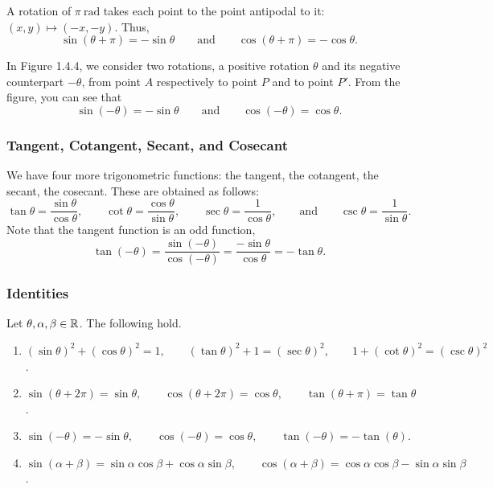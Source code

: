 \documentclass[11pt]{book}
\begin{document}
\vspace*{1.5em}

A rotation of $\pi\ \text{rad}$ takes each point to the point antipodal to it: $(x, y)\mapsto(-x, -y)$. Thus, $$\sin(\theta+\pi)=-\sin\theta\qquad\text{and}\qquad\cos(\theta+\pi)=-\cos\theta.$$

In Figure 1.4.4, we consider two rotations, a positive rotation $\theta$ and its negative counterpart $-\theta$, from point $A$ respectively to point $P$ and to point $P'$. From the figure, you can see that $$\sin(-\theta)=-\sin\theta\qquad\text{and}\qquad\cos(-\theta)=\cos\theta.$$

\subsubsection*{Tangent, Cotangent, Secant, and Cosecant}

We have four more trigonometric functions: the tangent, the cotangent, the secant, the cosecant. These are obtained as follows: $$\tan\theta=\dfrac{\sin\theta}{\cos\theta},\qquad\cot\theta=\dfrac{\cos\theta}{\sin\theta},\qquad\sec\theta=\dfrac{1}{\cos\theta},\qquad\text{and}\qquad\csc\theta=\dfrac{1}{\sin\theta}.$$ Note that the tangent function is an odd function, $$\tan(-\theta)=\dfrac{\sin(-\theta)}{\cos(-\theta)}=\dfrac{-\sin\theta}{\cos\theta}=-\tan\theta.$$

\subsubsection*{Identities}

\begin{theorem}
    Let $\theta, \alpha, \beta\in\mathbb{R}$. The following hold.
    \begin{enumerate}
        \item $(\sin\theta)^2+(\cos\theta)^2=1, \qquad (\tan\theta)^2+1=(\sec\theta)^2,\qquad 1+(\cot\theta)^2=(\csc\theta)^2$.
        \item $\sin(\theta+2\pi)=\sin\theta,\qquad\cos(\theta+2\pi)=\cos\theta,\qquad\tan(\theta+\pi)=\tan\theta$.
        \item $\sin(-\theta)=-\sin\theta,\qquad\cos(-\theta)=\cos\theta,\qquad\tan(-\theta)=-\tan(\theta)$.
        \item $\sin(\alpha+\beta)=\sin\alpha\cos\beta+\cos\alpha\sin\beta,\qquad\cos(\alpha+\beta)=\cos\alpha\cos\beta-\sin\alpha\sin\beta$.
    \end{enumerate}
\end{theorem}
\end{document}
